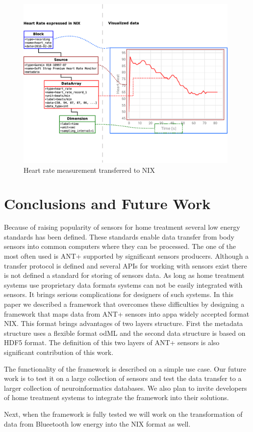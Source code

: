 \documentclass[conference]{IEEEtran}
\begin{document}
\begin{figure}
\centering\includegraphics[width=11cm]{NIX-example}
\caption{\label{NIX-ex}Heart rate measurement transferred to NIX}
\end{figure}



\section{Conclusions and Future Work}\label{sec:future-work}

Because of raising popularity of sensors for home treatment several low energy standards has been defined. These standards enable data transfer from body sensors into common computers where they can be processed. The one of the most often used is ANT+ supported by significant sensors producers. Although a transfer protocol is defined and several APIs for working with sensors exist there is not defined a standard for storing of sensors data. As long as home treatment systems use proprietary data formats systems can not be easily integrated with sensors. It brings serious complications for designers of such systems. In this paper we described a framework that overcomes these difficulties by designing a framework that maps data from ANT+ sensors into appa widely accepted format NIX. This format brings advantages of two layers structure. First the metadata structure uses a flexible format odML and the second data structure is based on HDF5 format. The definition of this two layers of ANT+ sensors is also significant contribution of this work. 

The functionality of the framework is described on a simple use case. Our future work is to test it on a large collection of sensors and test the data transfer to a larger collection of neuroinformatics databases. We also plan to invite developers of home treatment systems to integrate the framework into their solutions. 

Next, when the framework is fully tested we will work on the transformation of data from Blueetooth low energy into the NIX format as well. 






\end{document}
